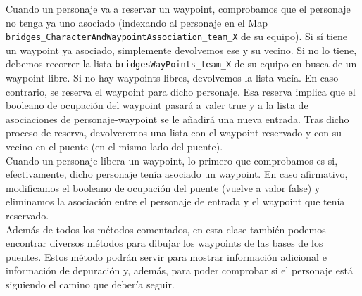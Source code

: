 Cuando un personaje va a reservar un waypoint, comprobamos que el personaje no tenga ya uno asociado (indexando al personaje en el Map \texttt{bridges\_CharacterAndWaypointAssociation\_team\_X} de su equipo). Si sí tiene un waypoint ya asociado, simplemente devolvemos ese y su vecino. Si no lo tiene, debemos recorrer la lista \texttt{bridgesWayPoints\_team\_X} de su equipo en busca de un waypoint libre. Si no hay waypoints libres, devolvemos la lista vacía. En caso contrario, se reserva el waypoint para dicho personaje. Esa reserva implica que el booleano de ocupación del waypoint pasará a valer true y a la lista de asociaciones de personaje-waypoint se le añadirá una nueva entrada. Tras dicho proceso de reserva, devolveremos una lista con el waypoint reservado y con su vecino en el puente (en el mismo lado del puente). \\

Cuando un personaje libera un waypoint, lo primero que comprobamos es si, efectivamente, dicho personaje tenía asociado un waypoint. En caso afirmativo, modificamos el booleano de ocupación del puente (vuelve a valor false) y eliminamos la asociación entre el personaje de entrada y el waypoint que tenía reservado. \\

Además de todos los métodos comentados, en esta clase también podemos encontrar diversos métodos para dibujar los waypoints de las bases de los puentes. Estos método podrán servir para mostrar información adicional e información de depuración y, además, para poder comprobar si el personaje está siguiendo el camino que debería seguir.


